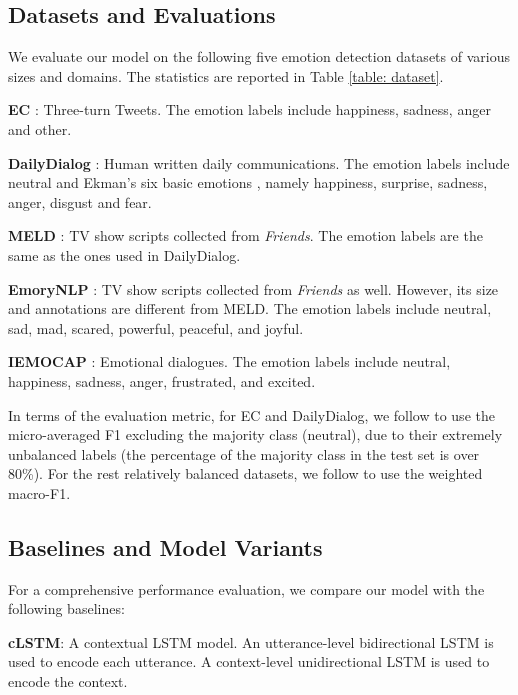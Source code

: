\documentclass[11pt,a4paper]{article}
\begin{document}
\subsection{Datasets and Evaluations}
\label{sec: dataset and evaluations}
We evaluate our model on the following five emotion detection datasets of various sizes and domains. The statistics are reported in Table \ref{table: dataset}. 

\noindent\textbf{EC} \cite{chatterjee2019understanding}: Three-turn Tweets. The emotion labels include happiness, sadness, anger and other.

\noindent\textbf{DailyDialog} \cite{li2017dailydialog}: Human written daily communications. The emotion labels include neutral and Ekman's six basic emotions \cite{ekman1992argument}, namely happiness, surprise, sadness, anger, disgust and fear.

\noindent\textbf{MELD} \cite{poria2018meld}: TV show scripts collected from \textit{Friends}. The emotion labels are the same as the ones used in DailyDialog.

\noindent\textbf{EmoryNLP} \cite{zahiri2018emotion}: TV show scripts collected from \textit{Friends} as well. However, its size and annotations are different from MELD. The emotion labels include neutral, sad, mad, scared, powerful, peaceful, and joyful.

\noindent\textbf{IEMOCAP} \cite{busso2008iemocap}: Emotional dialogues. The emotion labels include neutral, happiness, sadness, anger, frustrated, and excited.



In terms of the evaluation metric, for EC and DailyDialog, we follow \cite{chatterjee2019understanding} to use the micro-averaged F1 excluding the majority class (neutral), due to their extremely unbalanced labels (the percentage of the majority class in the test set is over 80\%). For the rest relatively balanced datasets, we follow \cite{majumder2018dialoguernn} to use the weighted macro-F1. 

\subsection{Baselines and Model Variants}
\label{sec: baselines}
For a comprehensive performance evaluation, we compare our model with the following baselines:

\noindent\textbf{cLSTM}: A contextual LSTM model. An utterance-level bidirectional LSTM is used to encode each utterance. A context-level unidirectional LSTM is used to encode the context.
\end{document}
